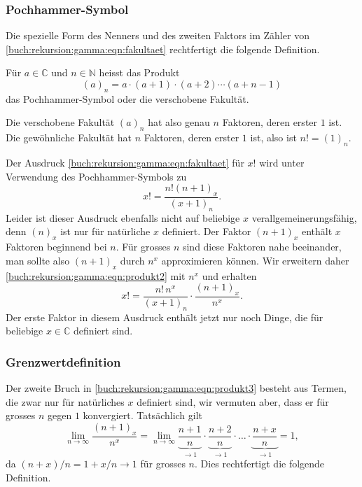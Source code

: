%
%
\subsubsection{Pochhammer-Symbol}
Die spezielle Form des Nenners und des zweiten Faktors im Zähler
von \eqref{buch:rekursion:gamma:eqn:fakultaet}
rechtfertigt die folgende Definition.

\begin{definition}[Pochhammer]
Für $a\in\mathbb{C}$ und $n\in\mathbb{N}$ heisst das Produkt
\[
(a)_n = a\cdot(a+1)\cdot(a+2)\cdots(a+n-1)
\]
das Pochhammer-Symbol oder die verschobene Fakultät.
\end{definition}

Die verschobene Fakultät $(a)_n$ hat also genau $n$ Faktoren, deren
erster $1$ ist.
Die gewöhnliche Fakultät hat $n$ Faktoren, deren erster $1$ ist, also
ist $n! = (1)_n$.

Der Ausdruck \eqref{buch:rekursion:gamma:eqn:fakultaet}
für $x!$ wird unter Verwendung des Pochhammer-Symbols zu
\begin{equation}
x! = \frac{n! (n+1)_x}{(x+1)_n}.
\label{buch:rekursion:gamma:eqn:produkt2}
\end{equation}
Leider ist dieser Ausdruck ebenfalls nicht auf beliebige $x$
verallgemeinerungsfähig, denn $(n)_x$ ist nur für natürliche $x$ definiert.
Der Faktor $(n+1)_x$ enthält $x$ Faktoren beginnend bei $n$.
Für grosses $n$ sind diese Faktoren nahe beeinander, man sollte also
$(n+1)_x$ durch $n^x$ approximieren können.
Wir erweitern daher \eqref{buch:rekursion:gamma:eqn:produkt2} mit $n^x$
und erhalten
\begin{equation}
x!
=
\frac{n!\,n^x}{(x+1)_n}\cdot
\frac{(n+1)_x}{n^x}.
\label{buch:rekursion:gamma:eqn:produkt3}
\end{equation}
Der erste Faktor in diesem Ausdruck enthält jetzt nur noch Dinge,
die für beliebige $x\in\mathbb{C}$ definiert sind.

%
%
\subsubsection{Grenzwertdefinition}
Der zweite Bruch in \eqref{buch:rekursion:gamma:eqn:produkt3}
besteht aus Termen, die zwar nur für natürliches $x$ definiert sind,
wir vermuten aber, dass er für grosses $n$ gegen $1$ konvergiert.
Tatsächlich gilt
\[
\lim_{n\to\infty}
\frac{(n+1)_x}{n^x}
=
\lim_{n\to\infty}
\underbrace{\frac{n+1}{n}}_{\displaystyle\to 1}
\cdot
\underbrace{\frac{n+2}{n}}_{\displaystyle\to 1}
\cdot\ldots\cdot
\underbrace{\frac{n+x}{n}}_{\displaystyle\to 1}
=
1,
\]
da  $(n+x)/n=1+x/n\to 1$ für grosses $n$.
Dies rechtfertigt die folgende Definition.

